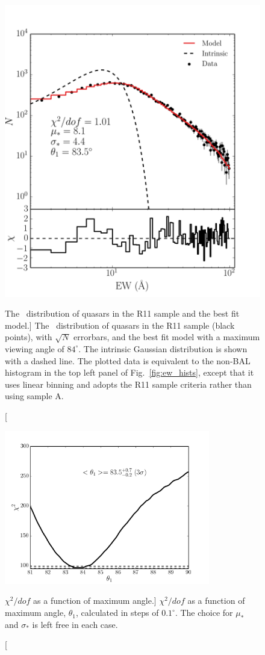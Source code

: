 \begin{figure}
\centering
\includegraphics[width=1.0\textwidth]{figures/ewpaper/quasar_fit.png}
\caption
[The \ewo\ distribution of quasars in the R11 sample and the best fit model.]
{
The \ewo\ distribution of quasars in the R11 sample (black points), 
with $\sqrt{N}$ errorbars, and the best fit model with a maximum 
viewing angle of $84^\circ$. The intrinsic Gaussian distribution
is shown with a dashed line. The plotted data is equivalent to the non-BAL histogram 
in the top left panel of Fig.~\ref{fig:ew_hists}, except that it uses linear binning
and adopts the R11 sample criteria rather than using sample A.
}
\label{fig:chi2}
\end{figure}

\begin{figure}
\centering
\includegraphics[width=0.8\textwidth]{figures/ewpaper/chi2_o3.png}
\caption
[$\chi^2/dof$ as a function of maximum angle.]
{
$\chi^2/dof$ as a function of maximum angle, $\theta_1$, calculated in
steps of $0.1^\circ$. The choice for $\mu_*$ and $\sigma_*$ is 
left free in each case.
}
\label{fig:chi2_curve}
\end{figure}

